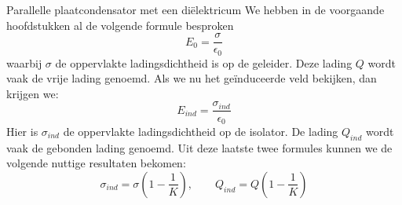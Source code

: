 \begin{app}{Parallelle plaatcondensator met een diëlektricum}
    We hebben in de voorgaande hoofdstukken al de volgende formule besproken
    \begin{equation*}
        E_0 = \dfrac{\sigma}{\epsilon_0}
    \end{equation*}
    waarbij $\sigma$ de oppervlakte ladingsdichtheid is op de geleider. Deze lading $Q$ wordt vaak de vrije lading genoemd.
    Als we nu het geïnduceerde veld bekijken, dan krijgen we:
    \begin{equation*}
        E_{ind} = \dfrac{\sigma_{ind}}{\epsilon_0}
    \end{equation*}
    Hier is $\sigma_{ind}$ de oppervlakte ladingsdichtheid op de isolator. De lading $Q_{ind}$ wordt vaak de gebonden lading genoemd. Uit deze laatste twee formules kunnen we de volgende nuttige resultaten bekomen:
    \begin{equation*}
            \sigma_{ind} = \sigma(1-\dfrac{1}{K}), \qquad Q_{ind} = Q(1-\dfrac{1}{K})
    \end{equation*}
\end{app}



